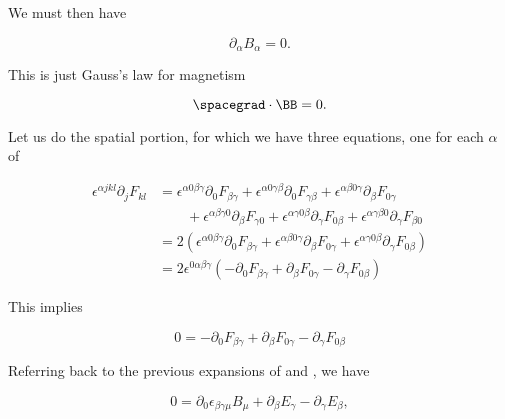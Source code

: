 We must then have

\begin{equation}\label{eqn:relativisticElectrodynamicsL11:830}
\partial_\alpha B_\alpha = 0.
\end{equation}

This is just Gauss's law for magnetism

\begin{equation}\label{eqn:relativisticElectrodynamicsL11:850}
\spacegrad \cdot \BB = 0.
\end{equation}

Let us do the spatial portion, for which we have three equations, one for each $\alpha$ of

\begin{align*}
\epsilon^{\alpha j k l} \partial_j F_{k l}
&=
\epsilon^{\alpha 0 \beta \gamma} \partial_0 F_{\beta \gamma}
+\epsilon^{\alpha 0 \gamma \beta} \partial_0 F_{\gamma \beta}
+\epsilon^{\alpha \beta 0 \gamma} \partial_\beta F_{0 \gamma} \\
&\qquad +\epsilon^{\alpha \beta \gamma 0} \partial_\beta F_{\gamma 0}
+\epsilon^{\alpha \gamma 0 \beta} \partial_\gamma F_{0 \beta}
+\epsilon^{\alpha \gamma \beta 0} \partial_\gamma F_{\beta 0} \\
&=
2 \left( 
\epsilon^{\alpha 0 \beta \gamma} \partial_0 F_{\beta \gamma}
+\epsilon^{\alpha \beta 0 \gamma} \partial_\beta F_{0 \gamma}
+\epsilon^{\alpha \gamma 0 \beta} \partial_\gamma F_{0 \beta}
\right) \\
&=
2 \epsilon^{0 \alpha \beta \gamma} \left(
-\partial_0 F_{\beta \gamma}
+\partial_\beta F_{0 \gamma}
- \partial_\gamma F_{0 \beta}
\right)
\end{align*}

This implies

\begin{equation}\label{eqn:relativisticElectrodynamicsL11:1320}
0 =
-\partial_0 F_{\beta \gamma}
+\partial_\beta F_{0 \gamma}
- \partial_\gamma F_{0 \beta}
\end{equation}

Referring back to the previous expansions of  and , we have

\begin{equation}\label{eqn:relativisticElectrodynamicsL11:1340}
0 =
\partial_0 \epsilon_{\beta\gamma\mu} B_\mu
+\partial_\beta E_\gamma
- \partial_\gamma E_{\beta},
\end{equation}

